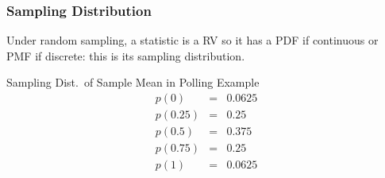 \documentclass[handout]{beamer}
\begin{document}
\begin{frame}
  \frametitle{Sampling Distribution}
  Under random sampling, a statistic is a RV so it has a PDF if continuous or PMF if discrete: this is its \alert{sampling distribution}. 

  \begin{block}{Sampling Dist.\ of Sample Mean in Polling Example}
   \begin{eqnarray*}
   p(0) &=&  0.0625\\
   p(0.25) &=&  0.25\\ 
   p(0.5) &=&  0.375\\
   p(0.75)&=& 0.25\\ 
   p(1) &=&  0.0625
   \end{eqnarray*}

  \end{block}
\end{frame}
\end{document}
